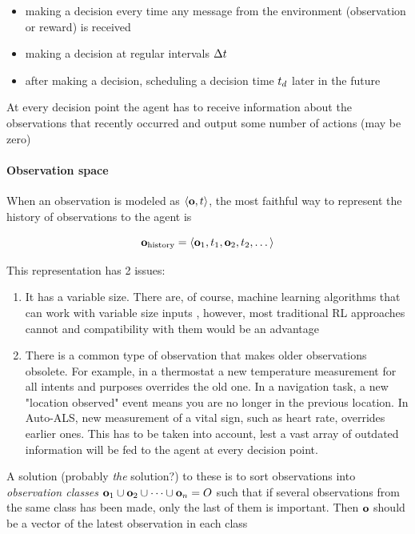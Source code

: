 \begin{itemize}
\item   making a decision every time any message from the environment   (observation or reward) is received 
\item   making a decision at regular intervals $\Delta t$ 
\item   after making a decision, scheduling a decision time $t_d$ later in the future
\end{itemize}

At every decision point the agent has to receive information about the observations that recently occurred and output some number of actions (may be zero)

\paragraph{Observation space}

When an observation is modeled as $\langle \mathbf{o}, t \rangle$, the most faithful way to represent the history of observations to the agent is

\begin{equation} 
\mathbf{o}_\text{history} = \langle \mathbf{o}_1, t_1, \mathbf{o}_2, t_2, \dots \rangle 
\end{equation}

This representation has 2 issues: 
\begin{enumerate}
    \item It has a variable size. There are, of course, machine learning algorithms that can work with variable size inputs \cite{hochreiterLongShorttermMemory1997}, however, most traditional RL approaches cannot and compatibility with them would be an advantage
    \item There is a common type of observation that makes older observations obsolete. For example, in a thermostat a new temperature measurement for all intents and purposes overrides the old one. In a navigation task, a new "location observed" event means you are no longer in the previous location. In Auto-ALS, new measurement of a vital sign, such as heart rate, overrides earlier ones. This has to be taken into account, lest a vast array of outdated information will be fed to the agent at every decision point.
\end{enumerate}

A solution (probably \emph{the} solution?) to these is to sort observations into \emph{observation classes} $\mathbf{o}_1 \cup \mathbf{o}_2 \cup \dots \cup \mathbf{o}_n = O$ such that if several observations from the same class has been made, only the last of them is important. Then $\mathbf{o}$ should be a vector of the latest observation in each class

